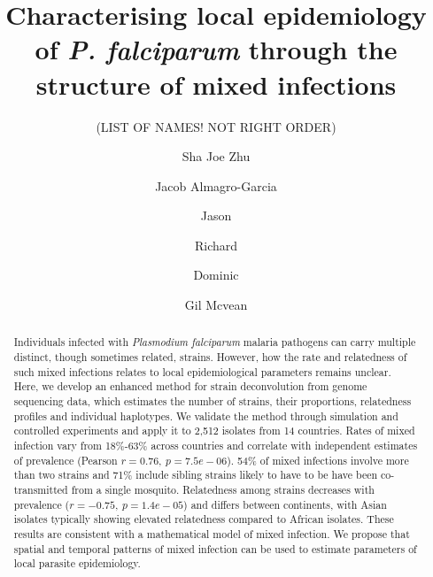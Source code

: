 \documentclass[9pt,lineno]{elife}
\newcounter{todocounter}
\newcommand{\done}[2][]
{\todo[color=green!40, #1]{#2}}
\newcommand{\donenum}[2][]
{\stepcounter{todocounter}\done[#1]{\thetodocounter: #2}}
\begin{document}
\title{Characterising local epidemiology of {\it P. falciparum} through the structure of mixed infections}
\newcommand\shorttitle{Mixed infections in malaria}
\date{}

\author{(LIST OF NAMES! NOT RIGHT ORDER)}
\author[1]{Sha Joe Zhu}
\author[1,2,3,4]{Jacob Almagro-Garcia}
\author[1]{Jason}
\author[2,3,4]{Richard}
\author[1,2,3,4]{Dominic}
\author[1,3]{Gil Mcvean}



\maketitle
{}
\listoftodos
{}





\begin{abstract}
Individuals infected with {\it Plasmodium falciparum} malaria pathogens can carry multiple distinct, though sometimes related, strains.  However, how the rate and relatedness of such mixed infections relates to local epidemiological parameters remains unclear.  Here, we develop an enhanced method for strain deconvolution from genome sequencing data, which estimates the number of strains, their proportions, relatedness profiles and individual haplotypes.  We validate the method through simulation and controlled experiments and apply it to 2,512 isolates from 14 countries.  Rates of mixed infection vary from 18\%-63\% across countries and correlate with independent estimates of prevalence (Pearson $r = 0.76,~p = 7.5e-06$).  54\% of mixed infections involve more than two strains and 71\% include sibling strains likely to have to be have been co-transmitted from a single mosquito.  Relatedness among strains decreases with prevalence ($r = -0.75,~p = 1.4e-05$) and differs between continents, with Asian isolates typically showing elevated relatedness compared to African isolates.  These results are consistent with a mathematical model of mixed infection.  We propose that spatial and temporal patterns of mixed infection can be used to estimate parameters of local parasite epidemiology.
\end{abstract}
\end{document}

